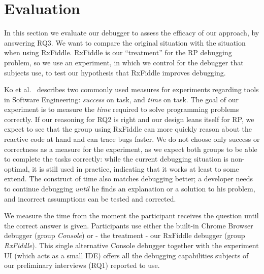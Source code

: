 \section{Evaluation}
\label{section-evaluation}

In this section we evaluate our debugger to assess the efficacy of our approach, by answering RQ3.
We want to compare the original situation with the situation when using RxFiddle. 
RxFiddle is our ``treatment'' for the RP debugging problem, so we use an experiment, in which we control for the debugger that subjects use, to test our hypothesis that RxFiddle improves debugging.

Ko et al.~\cite{ko2015practical} describes two commonly used measures for experiments regarding tools in Software Engineering: \emph{success} on task, and \emph{time} on task.
The goal of our experiment is to measure the \textit{time} required to solve programming problems correctly.
If our reasoning for RQ2 is right and our design leans itself for RP, we expect to see that the group using RxFiddle can more quickly reason about the reactive code at hand and can trace bugs faster.
We do not choose only success or correctness as a measure for the experiment, as we expect both groups to be able to complete the tasks correctly: while the current debugging situation is non-optimal, it is still used in practice, indicating that it works at least to some extend.
The construct of time also matches debugging better; a developer needs to continue debugging \textit{until} he finds an explanation or a solution to his problem, and incorrect assumptions can be tested and corrected. 

We measure the time from the moment the participant receives the question until the correct answer is given. Participants use either the built-in Chrome Browser debugger (group \emph{Console}) or - the treatment - our RxFiddle debugger (group \emph{RxFiddle}). This single alternative Console debugger together with the experiment UI (which acts as a small IDE) offers all the debugging capabilities subjects of our preliminary interviews (RQ1) reported to use.

